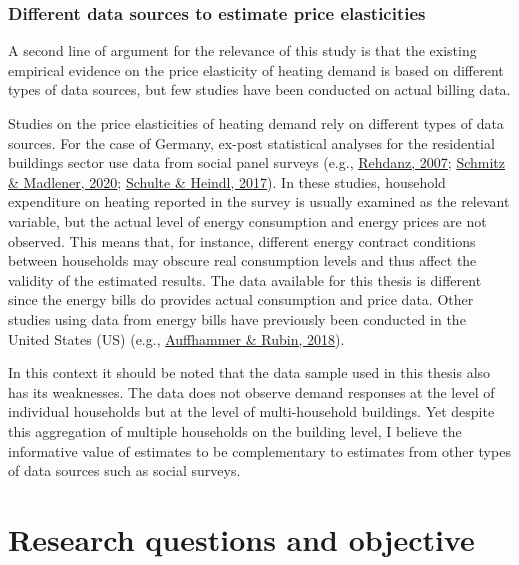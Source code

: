 \documentclass[12pt,twoside]{reedthesis}
\begin{document}
\hypertarget{different-data-sources-to-estimate-price-elasticities}{%
\subsubsection*{Different data sources to estimate price elasticities}\label{different-data-sources-to-estimate-price-elasticities}}

A second line of argument for the relevance of this study is that the existing empirical evidence on the price elasticity of heating demand is based on different types of data sources, but few studies have been conducted on actual billing data.

Studies on the price elasticities of heating demand rely on different types of data sources. For the case of Germany, ex-post statistical analyses for the residential buildings sector use data from social panel surveys (e.g., \protect\hyperlink{ref-rehdanz07}{Rehdanz, 2007}; \protect\hyperlink{ref-schmitz_madlener20}{Schmitz \& Madlener, 2020}; \protect\hyperlink{ref-schulte_heindl17}{Schulte \& Heindl, 2017}). In these studies, household expenditure on heating reported in the survey is usually examined as the relevant variable, but the actual level of energy consumption and energy prices are not observed. This means that, for instance, different energy contract conditions between households may obscure real consumption levels and thus affect the validity of the estimated results. The data available for this thesis is different since the energy bills do provides actual consumption and price data. Other studies using data from energy bills have previously been conducted in the United States (US) (e.g., \protect\hyperlink{ref-auffhammer_rubin18}{Auffhammer \& Rubin, 2018}).

In this context it should be noted that the data sample used in this thesis also has its weaknesses. The data does not observe demand responses at the level of individual households but at the level of multi-household buildings. Yet despite this aggregation of multiple households on the building level, I believe the informative value of estimates to be complementary to estimates from other types of data sources such as social surveys.

\hypertarget{objective}{%
\section{Research questions and objective}\label{objective}}
\end{document}
